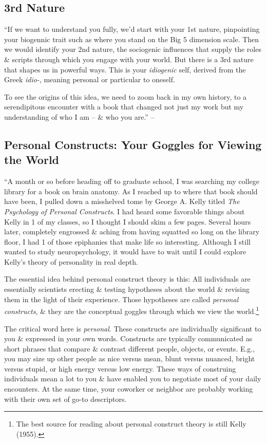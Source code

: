 \documentclass{article}
\numberwithin{equation}{section}
\begin{document}
\subsection{3rd Nature}
``If we want to understand you fully, we'd start with your 1st nature, pinpointing your biogennic trait such as where you stand on the Big 5 dimension scale. Then we would identify your 2nd nature, the sociogenic influences that supply the roles \& scripts through which you engage with your world. But there is a 3rd nature that shapes us in powerful ways. This is your \textit{idiogenic} self, derived from the Greek \textit{idio-}, meaning personal or particular to oneself.

To see the origins of this idea, we need to zoom back in my own history, to a serendipitous encounter with a book that changed not just my work but my understanding of who I am -- \& who you are.'' -- \cite[p. 23]{Little2017}

\subsection{Personal Constructs: Your Goggles for Viewing the World}
``A month or so before heading off to graduate school, I was searching my college library for a book on brain anatomy. As I reached up to where that book should have been, I pulled down a misshelved tome by George A. Kelly titled \textit{The Psychology of Personal Constructs}. I had heard some favorable things about Kelly in 1 of my classes, so I thought I should skim a few pages. Several hours later, completely engrossed \& aching from having squatted so long on the library floor, I had 1 of those epiphanies that make life so interesting. Although I still wanted to study neuropsychology, it would have to wait until I could explore Kelly's theory of personality in real depth.

The essential idea behind personal construct theory is this: All individuals are essentially scientists erecting \& testing hypotheses about the world \& revising them in the light of their experience. Those hypotheses are called \textit{personal constructs}, \& they are the conceptual goggles through which we view the world.\footnote{The best source for reading about personal construct theory is still Kelly (1955).}

The critical word here is \textit{personal}. These constructs are individually significant to you \& expressed in your own words. Constructs are typically communicated as short phrases that compare \& contrast different people, objects, or events. E.g., you may size up other people as nice versus mean, blunt versus nuanced, bright versus stupid, or high energy versus low energy. These ways of construing individuals mean a lot to you \& have enabled you to negotiate most of your daily encounters. At the same time, your coworker or neighbor are probably working with their own set of go-to descriptors.
\end{document}
